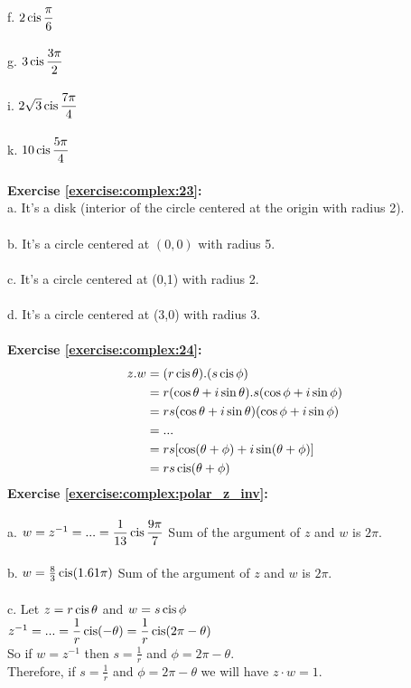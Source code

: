 f. $2\operatorname{cis}\displaystyle\frac{\pi}{6}$\\
\\
g. $3\operatorname{cis}\displaystyle\frac{3\pi}{2}$\\
\\
i. $2\sqrt{3}\operatorname{cis}\displaystyle\frac{7\pi}{4}$\\
\\
k. $10\operatorname{cis}\displaystyle\frac{5\pi}{4}$\\
\\
\textbf{Exercise \ref{exercise:complex:23}:}\\
a. It's a disk (interior of the circle centered at the origin with radius 2).\\
\\
b. It's a circle centered at $(0,0)$ with radius 5.\\
\\
c. It's a circle centered at (0,1) with radius 2.\\
\\
d. It's a circle centered at (3,0) with radius 3.\\
\\
\textbf{Exercise \ref{exercise:complex:24}:}
\begin{align*}
z.w & = (r\operatorname{cis}\theta).(s\operatorname{cis}\phi)\\
&= r(\cos\theta+i\sin\theta).s(\cos\phi+i\sin\phi)\\
&= rs(\cos\theta+i\sin\theta)(\cos\phi+i\sin\phi)\\
&= ...\\
&= rs[\cos(\theta+\phi)+i\sin(\theta+\phi)]\\
&= rs\operatorname{cis}(\theta+\phi)
\end{align*}
\textbf{Exercise \ref{exercise:complex:polar_z_inv}:}\\
\\
a. $w=z^{-1}=...=\displaystyle\frac{1}{13}\operatorname{cis}\frac{9\pi}{7}$
Sum of the argument of $z$ and $w$ is $2\pi$.\\
\\
b. $w=\frac{8}{3}\operatorname{cis}(1.61\pi)$ 
Sum of the argument of $z$ and $w$ is $2\pi$.\\
\\
c. Let $z=r\operatorname{cis}\theta$ and $w=s\operatorname{cis}\phi$\\
$z^{-1}=...=\displaystyle\frac{1}{r}\operatorname{cis}(-\theta)=\frac{1}{r}\operatorname{cis}(2\pi-\theta)$\\
So if $w=z^{-1}$ then $s=\displaystyle\frac{1}{r}$ and $\phi=2\pi-\theta$.\\
Therefore, if $s=\displaystyle\frac{1}{r}$ and $\phi=2\pi-\theta$ we will have $z\cdot w=1$.\\
